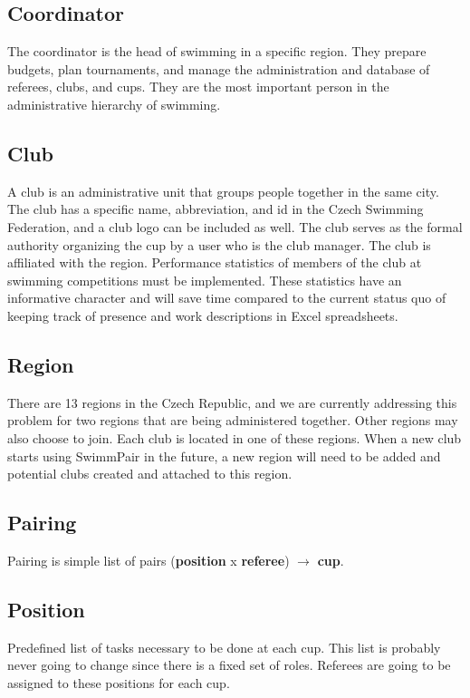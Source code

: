 \subsection*{Coordinator}
The coordinator is the head of swimming in a specific region. They prepare budgets, plan tournaments, and manage the administration and database of referees, clubs, and cups. They are the most important person in the administrative hierarchy of swimming.
\subsection*{Club}
\par
A club is an administrative unit that groups people together in the same city. The club has a specific name, abbreviation, and id in the Czech Swimming Federation, and a club logo can be included as well. The club serves as the formal authority organizing the cup by a user who is the club manager. The club is affiliated with the region. Performance statistics of members of the club at swimming competitions must be implemented. These statistics have an informative character and will save time compared to the current status quo of keeping track of presence and work descriptions in Excel spreadsheets.
\subsection*{Region}
There are 13 regions in the Czech Republic, and we are currently addressing this problem for two regions that are being administered together. Other regions may also choose to join. Each club is located in one of these regions. When a new club starts using SwimmPair in the future, a new region will need to be added and potential clubs created and attached to this region.

\subsection*{Pairing}
Pairing is simple list of pairs (\textbf{position} x \textbf{referee}) $\rightarrow$ \textbf{cup}.
\subsection*{Position}
Predefined list of tasks necessary to be done at each cup. This list is probably never going to change since there is a fixed set of roles. Referees are going to be assigned to these positions for each cup.
\newpage
